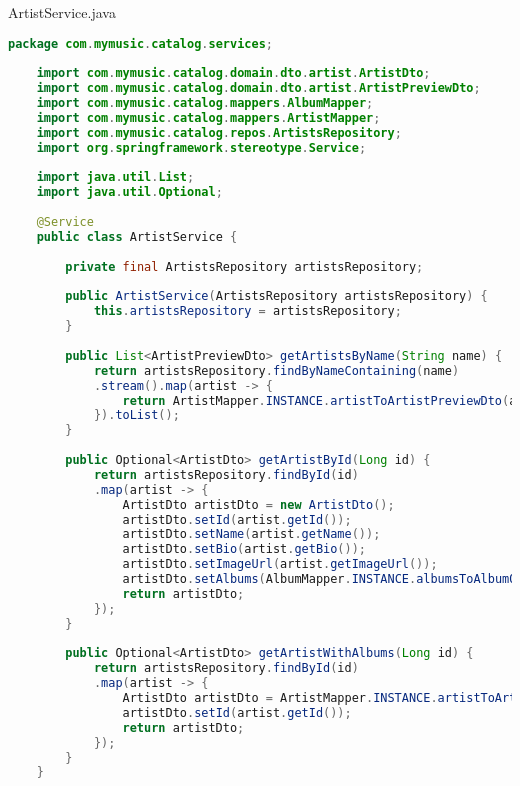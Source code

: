 ArtistService.java
\begin{lstlisting}[language=java]
	package com.mymusic.catalog.services;
	
	import com.mymusic.catalog.domain.dto.artist.ArtistDto;
	import com.mymusic.catalog.domain.dto.artist.ArtistPreviewDto;
	import com.mymusic.catalog.mappers.AlbumMapper;
	import com.mymusic.catalog.mappers.ArtistMapper;
	import com.mymusic.catalog.repos.ArtistsRepository;
	import org.springframework.stereotype.Service;
	
	import java.util.List;
	import java.util.Optional;
	
	@Service
	public class ArtistService {
		
		private final ArtistsRepository artistsRepository;
		
		public ArtistService(ArtistsRepository artistsRepository) {
			this.artistsRepository = artistsRepository;
		}
		
		public List<ArtistPreviewDto> getArtistsByName(String name) {
			return artistsRepository.findByNameContaining(name)
			.stream().map(artist -> {
				return ArtistMapper.INSTANCE.artistToArtistPreviewDto(artist);
			}).toList();
		}
		
		public Optional<ArtistDto> getArtistById(Long id) {
			return artistsRepository.findById(id)
			.map(artist -> {
				ArtistDto artistDto = new ArtistDto();
				artistDto.setId(artist.getId());
				artistDto.setName(artist.getName());
				artistDto.setBio(artist.getBio());
				artistDto.setImageUrl(artist.getImageUrl());
				artistDto.setAlbums(AlbumMapper.INSTANCE.albumsToAlbumOfArtistPreviewDtos(artist.getAlbums()));
				return artistDto;
			});
		}
		
		public Optional<ArtistDto> getArtistWithAlbums(Long id) {
			return artistsRepository.findById(id)
			.map(artist -> {
				ArtistDto artistDto = ArtistMapper.INSTANCE.artistToArtistDto(artist);
				artistDto.setId(artist.getId());
				return artistDto;
			});
		}
	}
	
\end{lstlisting}

